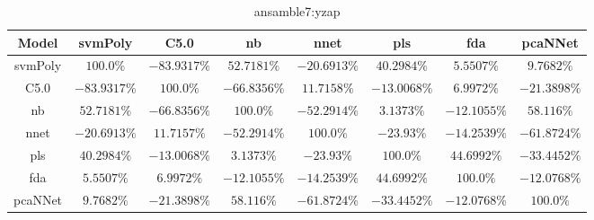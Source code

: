 \begin{table}[!ht]
	\centering
	\begin{tabular}{|c|c|c|c|c|c|c|c|}
		\hline
		Model & svmPoly & C5.0 & nb & nnet & pls & fda & pcaNNet \\ \hline
		svmPoly & $100.0\%$ & $-83.9317\%$ & $52.7181\%$ & $-20.6913\%$ & $40.2984\%$ & $5.5507\%$ & $9.7682\%$ \\ \hline
		C5.0 & $-83.9317\%$ & $100.0\%$ & $-66.8356\%$ & $11.7158\%$ & $-13.0068\%$ & $6.9972\%$ & $-21.3898\%$ \\ \hline
		nb & $52.7181\%$ & $-66.8356\%$ & $100.0\%$ & $-52.2914\%$ & $3.1373\%$ & $-12.1055\%$ & $58.116\%$ \\ \hline
		nnet & $-20.6913\%$ & $11.7157\%$ & $-52.2914\%$ & $100.0\%$ & $-23.93\%$ & $-14.2539\%$ & $-61.8724\%$ \\ \hline
		pls & $40.2984\%$ & $-13.0068\%$ & $3.1373\%$ & $-23.93\%$ & $100.0\%$ & $44.6992\%$ & $-33.4452\%$ \\ \hline
		fda & $5.5507\%$ & $6.9972\%$ & $-12.1055\%$ & $-14.2539\%$ & $44.6992\%$ & $100.0\%$ & $-12.0768\%$ \\ \hline
		pcaNNet & $9.7682\%$ & $-21.3898\%$ & $58.116\%$ & $-61.8724\%$ & $-33.4452\%$ & $-12.0768\%$ & $100.0\%$ \\ \hline
	\end{tabular}
	\caption{ansamble7:yzap}
	\label{tab:ansamble7:yzap}
\end{table}
